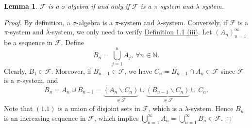 \documentclass{article}
\numberwithin{equation}{section}
\theoremstyle{plain}
\newtheorem{lemma}[theorem]{Lemma}
\theoremstyle{definition}
\begin{document}
\begin{lemma}\label{lemma:1.6} $\mathscr{F}$ is a $\sigma$-algebra if and only if $\mathscr{F}$ is a $\pi$-system and $\lambda$-system.
\end{lemma}
\begin{proof}
By definition, a $\sigma$-algebra is a $\pi$-system and $\lambda$-system. Conversely, if $\mathscr{F}$ is a $\pi$-system and $\lambda$-system, we only need to verify \hyperref[def:1.1]{Definition 1.1 (iii)}. Let $(A_n)_{n=1}^\infty$ be a sequence in $\mathscr{F}$. Define $$B_n=\bigcup_{j=1}^n A_j,\ \forall n\in\mathbb{N}.$$
Clearly, $B_1\in\mathscr{F}$. Moreover, if $B_{n-1}\in\mathscr{F}$, we have $C_n=B_{n-1}\cap A_n\in\mathscr{F}$ since $\mathscr{F}$ is a $\pi$-system, and
\begin{align*}
	B_n = A_n\cup B_{n-1} = \underbrace{(A_n\backslash C_n)}_{\in\mathscr{F}}\cup\underbrace{(B_{n-1}\backslash C_n)}_{\in\mathscr{F}}\cup\,C_n.\tag{1.1}\label{eq:1.1}
\end{align*}
Note that $\hyperref[eq:1.1]{(1.1)}$ is a union of disjoint sets in $\mathscr{F}$, which is a $\lambda$-system. Hence $B_n$ is an increasing sequence in $\mathscr{F}$, which implies $\bigcup_{n=1}^\infty A_n=\bigcup_{n=1}^\infty B_n\in\mathscr{F}$.
\end{proof}
\end{document}
